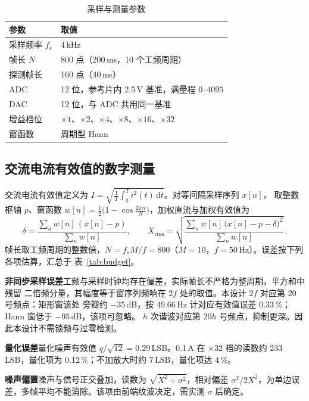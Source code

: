 \documentclass[12pt]{article}
\newcommand{\wuhao}{\fontsize{10.5pt}{15pt}\selectfont}
\begin{document}
\begin{table}[htbp]\centering
\caption{采样与测量参数}
\label{tab:param}
\wuhao
\begin{tabular}{ll}
\toprule
参数 & 取值\\
\midrule
采样频率 $f_s$      & 4\,kHz\\
帧长 $N$            & 800 点（200\,ms，10 个工频周期）\\
探测帧长            & 160 点（40\,ms）\\
ADC                 & 12 位，参考片内 2.5\,V 基准，满量程 $0\text{--}4095$\\
DAC                 & 12 位，与 ADC 共用同一基准\\
增益档位            & $\times1$、$\times2$、$\times4$、$\times8$、$\times16$、$\times32$\\
窗函数              & 周期型 Hann\\
\bottomrule
\end{tabular}
\end{table}

\subsection{交流电流有效值的数字测量}
交流电流有效值定义为 $I=\sqrt{\frac1T\int_0^T i^2(t)\,\mathrm{d}t}$。对等间隔采样序列 $x[n]$，
取整数枢轴 $p$、窗函数 $w[n]=\tfrac12\bigl(1-\cos\frac{2\pi n}{N}\bigr)$，加权直流与加权有效值为
\begin{equation}
  \delta=\frac{\sum_n w[n]\,(x[n]-p)}{\sum_n w[n]},\qquad
  X_{\text{rms}}=\sqrt{\frac{\sum_n w[n]\,\bigl(x[n]-p-\delta\bigr)^2}{\sum_n w[n]}}\,.
\end{equation}
帧长取工频周期的整数倍，$N=f_s M/f=800$（$M=10$，$f=50$\,Hz）。误差按下列各项估算，汇总于
表~\ref{tab:budget}。

\textbf{非同步采样误差}\quad 工频与采样时钟均存在偏差，实际帧长不严格为整周期，平方和中残留
二倍频分量，其幅度等于窗序列频响在 $2f$ 处的取值。本设计 $2f$ 对应第 20 号频点：矩形窗该处
旁瓣约 $-35$\,dB，按 49.66\,Hz 计对应有效值误差 0.33\,\%；Hann 窗低于 $-95$\,dB，该项可忽略。
$h$ 次谐波对应第 $20h$ 号频点，抑制更深。因此本设计不需锁频与过零检测。

\textbf{量化误差}\quad 量化噪声有效值 $q/\sqrt{12}=0.29$\,LSB。0.1\,A 在 $\times32$ 档的读数约
233\,LSB，量化项为 0.12\,\%；不加放大时约 7\,LSB，量化项达 4\,\%。

\textbf{噪声偏置}\quad 噪声与信号正交叠加，读数为 $\sqrt{X^2+\sigma^2}$，相对偏差
$\sigma^2/2X^2$，为单边误差，多帧平均不能消除。该项由前端纹波决定，需实测 $\sigma$ 后确定。
\end{document}
